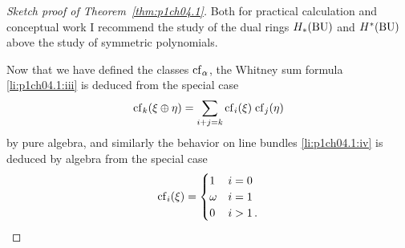 \documentclass[../main]{subfiles}
\begin{document}
\begin{proof}[Sketch proof of Theorem~\ref{thm:p1ch04.1}]
Both for practical calculation and conceptual work I recommend the study of the dual rings $H_\ast(\operatorname{BU})$ and $H^\ast(\operatorname{BU})$ above the study of symmetric polynomials.

Now that we have defined the classes $\mathrm{cf}_\alpha$, the Whitney sum formula \ref{li:p1ch04.1:iii} is deduced from the special case 
\begin{equation*}
	\mathrm{cf}_k(\xi \oplus \eta) = \sum_{i + j = k} \mathrm{cf}_i (\xi)\; \mathrm{cf}_j (\eta)
\end{equation*}
by pure algebra, and similarly the behavior on line bundles \ref{li:p1ch04.1:iv} is deduced by algebra from the special case 
\begin{equation*}
	\mathrm{cf}_i(\xi) = \begin{cases}
		1 & i = 0 \\ 
		\omega & i = 1 \\ 
		0 & i > 1\,.
	\end{cases}
\end{equation*}
\end{proof}
\end{document}
